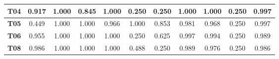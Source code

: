 \begin{table}[htbp]
\begin{tabular}{|c|cccccccccc|}
		\textbf{T04}                                             & \multicolumn{1}{c|}{0.917}                               & \multicolumn{1}{c|}{1.000}                               & \multicolumn{1}{c|}{0.845}                               & \multicolumn{1}{c|}{1.000}                               & \multicolumn{1}{c|}{0.250}                               & \multicolumn{1}{c|}{0.250}                               & \multicolumn{1}{c|}{1.000}                               & \multicolumn{1}{c|}{1.000}                               & \multicolumn{1}{c|}{0.250}                               & 0.997        \\ \hline
		\rowcolor[HTML]{F2F2F2} 
		\textbf{T05}                                             & \multicolumn{1}{c|}{\cellcolor[HTML]{F2F2F2}0.449}       & \multicolumn{1}{c|}{\cellcolor[HTML]{F2F2F2}1.000}       & \multicolumn{1}{c|}{\cellcolor[HTML]{F2F2F2}1.000}       & \multicolumn{1}{c|}{\cellcolor[HTML]{F2F2F2}0.966}       & \multicolumn{1}{c|}{\cellcolor[HTML]{F2F2F2}1.000}       & \multicolumn{1}{c|}{\cellcolor[HTML]{F2F2F2}0.853}       & \multicolumn{1}{c|}{\cellcolor[HTML]{F2F2F2}0.981}       & \multicolumn{1}{c|}{\cellcolor[HTML]{F2F2F2}0.968}       & \multicolumn{1}{c|}{\cellcolor[HTML]{F2F2F2}0.250}       & 0.997        \\ \hline
		\textbf{T06}                                             & \multicolumn{1}{c|}{0.955}                               & \multicolumn{1}{c|}{1.000}                               & \multicolumn{1}{c|}{1.000}                               & \multicolumn{1}{c|}{1.000}                               & \multicolumn{1}{c|}{0.250}                               & \multicolumn{1}{c|}{0.625}                               & \multicolumn{1}{c|}{0.997}                               & \multicolumn{1}{c|}{0.994}                               & \multicolumn{1}{c|}{0.250}                               & 0.989        \\ \hline
		\rowcolor[HTML]{F2F2F2} 
		\textbf{T08}                                             & \multicolumn{1}{c|}{\cellcolor[HTML]{F2F2F2}0.986}       & \multicolumn{1}{c|}{\cellcolor[HTML]{F2F2F2}1.000}       & \multicolumn{1}{c|}{\cellcolor[HTML]{F2F2F2}1.000}       & \multicolumn{1}{c|}{\cellcolor[HTML]{F2F2F2}1.000}       & \multicolumn{1}{c|}{\cellcolor[HTML]{F2F2F2}0.488}       & \multicolumn{1}{c|}{\cellcolor[HTML]{F2F2F2}0.250}       & \multicolumn{1}{c|}{\cellcolor[HTML]{F2F2F2}0.989}       & \multicolumn{1}{c|}{\cellcolor[HTML]{F2F2F2}0.976}       & \multicolumn{1}{c|}{\cellcolor[HTML]{F2F2F2}0.250}       & 0.986        \\ \hline

\end{tabular}
\end{table}
